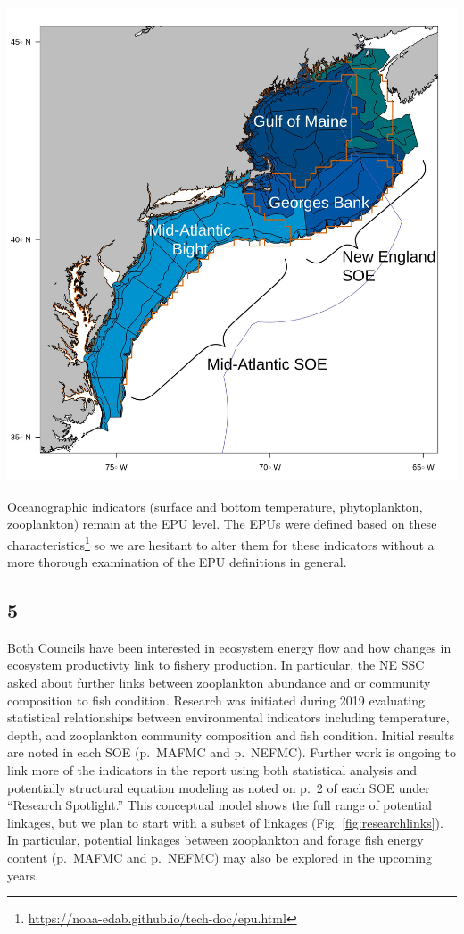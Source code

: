 \documentclass[
  10pt,
]{article}
\let\origfigure\figure
\let\endorigfigure\endfigure
\renewenvironment{figure}[1][2] {
    \expandafter\origfigure\expandafter[H]
} {
    \endorigfigure
}
\begin{document}
\begin{figure}

{\centering \includegraphics[width=0.8\linewidth]{images/EPU_Designations_Map} 

}

\caption{Survey strata mapping to EPUs for biomass estimates}\label{fig:survbio-strata}
\end{figure}

Oceanographic indicators (surface and bottom temperature, phytoplankton,
zooplankton) remain at the EPU level. The EPUs were defined based on
these characteristics\footnote{\url{https://noaa-edab.github.io/tech-doc/epu.html}}
so we are hesitant to alter them for these indicators without a more
thorough examination of the EPU definitions in general.

\hypertarget{section-4}{%
\subsection{5}\label{section-4}}

Both Councils have been interested in ecosystem energy flow and how
changes in ecosystem productivty link to fishery production. In
particular, the NE SSC asked about further links between zooplankton
abundance and or community composition to fish condition. Research was
initiated during 2019 evaluating statistical relationships between
environmental indicators including temperature, depth, and zooplankton
community composition and fish condition. Initial results are noted in
each SOE (p.~MAFMC and p.~NEFMC). Further work is ongoing to link more
of the indicators in the report using both statistical analysis and
potentially structural equation modeling as noted on p.~2 of each SOE
under ``Research Spotlight.'' This conceptual model shows the full range
of potential linkages, but we plan to start with a subset of linkages
(Fig. \ref{fig:researchlinks}). In particular, potential linkages
between zooplankton and forage fish energy content (p.~MAFMC and
p.~NEFMC) may also be explored in the upcoming years.
\end{document}
